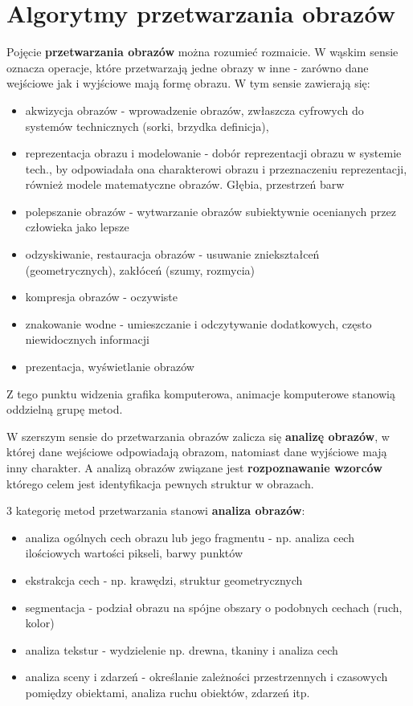 \documentclass[]{report}
\begin{document}
\section{Algorytmy przetwarzania obrazów}
Pojęcie \textbf{przetwarzania obrazów} można rozumieć rozmaicie. W wąskim sensie oznacza operacje, które przetwarzają jedne obrazy w inne - zarówno dane wejściowe jak i wyjściowe mają formę obrazu. W tym sensie zawierają się:
\begin{itemize}
	\item akwizycja obrazów - wprowadzenie obrazów, zwłaszcza cyfrowych do systemów technicznych (sorki, brzydka definicja),
	\item reprezentacja obrazu i modelowanie - dobór reprezentacji obrazu w systemie tech., by odpowiadała ona charakterowi obrazu i przeznaczeniu reprezentacji, również modele matematyczne obrazów. Głębia, przestrzeń barw
	\item polepszanie obrazów - wytwarzanie obrazów subiektywnie ocenianych przez człowieka jako lepsze
	\item odzyskiwanie, restauracja obrazów - usuwanie zniekształceń (geometrycznych), zakłóceń (szumy, rozmycia)
	\item kompresja obrazów - oczywiste
	\item znakowanie wodne - umieszczanie i odczytywanie dodatkowych, często niewidocznych informacji
	\item prezentacja, wyświetlanie obrazów
\end{itemize}
	
	Z tego punktu widzenia grafika komputerowa, animacje komputerowe stanowią oddzielną grupę metod.
	
	W szerszym sensie do przetwarzania obrazów zalicza się \textbf{analizę obrazów}, w której dane wejściowe odpowiadają obrazom, natomiast dane wyjściowe mają inny charakter. A analizą obrazów związane jest \textbf{rozpoznawanie wzorców} którego celem jest identyfikacja pewnych struktur w obrazach.
	
	3 kategorię metod przetwarzania stanowi \textbf{analiza obrazów}:
\begin{itemize}
	\item analiza ogólnych cech obrazu lub jego fragmentu - np. analiza cech ilościowych wartości pikseli, barwy punktów
	\item ekstrakcja cech - np. krawędzi, struktur geometrycznych
	\item segmentacja - podział obrazu na spójne obszary o podobnych cechach (ruch, kolor)
	\item analiza tekstur - wydzielenie np. drewna, tkaniny i analiza cech
	\item analiza sceny i zdarzeń - określanie zależności przestrzennych i czasowych pomiędzy obiektami, analiza ruchu obiektów, zdarzeń itp.
\end{itemize}
\end{document}
